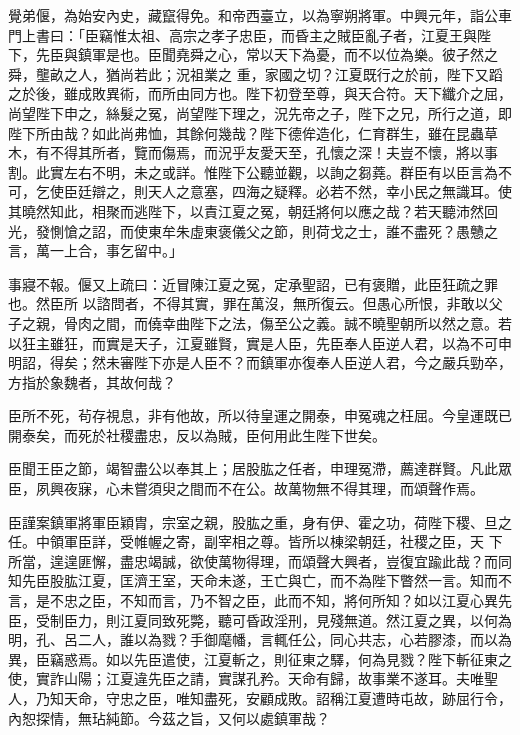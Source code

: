 \begin{pinyinscope}
 覺弟偃，為始安內史，藏竄得免。和帝西臺立，以為寧朔將軍。中興元年，詣公車門上書曰：「臣竊惟太祖、高宗之孝子忠臣，而昏主之賊臣亂子者，江夏王與陛下，先臣與鎮軍是也。臣聞堯舜之心，常以天下為憂，而不以位為樂。彼孑然之舜，壟畝之人，猶尚若此；況祖業之
 重，家國之切？江夏既行之於前，陛下又蹈之於後，雖成敗異術，而所由同方也。陛下初登至尊，與天合符。天下纖介之屈，尚望陛下申之，絲髮之冤，尚望陛下理之，況先帝之子，陛下之兄，所行之道，即陛下所由哉？如此尚弗恤，其餘何幾哉？陛下德侔造化，仁育群生，雖在昆蟲草木，有不得其所者，覽而傷焉，而況乎友愛天至，孔懷之深！夫豈不懷，將以事割。此實左右不明，未之或詳。惟陛下公聽並觀，以詢之芻蕘。群臣有以臣言為不可，乞使臣廷辯之，則天人之意塞，四海之疑釋。必若不然，幸小民之無識耳。使其曉然知此，相聚而逃陛下，以責江夏之冤，朝廷將何以應之哉？若天聽沛然回光，發惻愴之詔，而使東牟朱虛東褒儀父之節，則荷戈之士，誰不盡死？愚戇之言，萬一上合，事乞留中。」



 事寢不報。偃又上疏曰：近冒陳江夏之冤，定承聖詔，已有褒贈，此臣狂疏之罪也。然臣所
 以諮問者，不得其實，罪在萬沒，無所復云。但愚心所恨，非敢以父子之親，骨肉之間，而僥幸曲陛下之法，傷至公之義。誠不曉聖朝所以然之意。若以狂主雖狂，而實是天子，江夏雖賢，實是人臣，先臣奉人臣逆人君，以為不可申明詔，得矣；然未審陛下亦是人臣不？而鎮軍亦復奉人臣逆人君，今之嚴兵勁卒，方指於象魏者，其故何哉？



 臣所不死，茍存視息，非有他故，所以待皇運之開泰，申冤魂之枉屈。今皇運既已開泰矣，而死於社稷盡忠，反以為賊，臣何用此生陛下世矣。



 臣聞王臣之節，竭智盡公以奉其上；居股肱之任者，申理冤滯，薦達群賢。凡此眾臣，夙興夜寐，心未嘗須臾之間而不在公。故萬物無不得其理，而頌聲作焉。



 臣謹案鎮軍將軍臣穎胄，宗室之親，股肱之重，身有伊、霍之功，荷陛下稷、旦之任。中領軍臣詳，受帷幄之寄，副宰相之尊。皆所以棟梁朝廷，社稷之臣，天
 下所當，遑遑匪懈，盡忠竭誠，欲使萬物得理，而頌聲大興者，豈復宜踰此哉？而同知先臣股肱江夏，匡濟王室，天命未遂，王亡與亡，而不為陛下瞥然一言。知而不言，是不忠之臣，不知而言，乃不智之臣，此而不知，將何所知？如以江夏心異先臣，受制臣力，則江夏同致死斃，聽可昏政淫刑，見殘無道。然江夏之異，以何為明，孔、呂二人，誰以為戮？手御麾幡，言輒任公，同心共志，心若膠漆，而以為異，臣竊惑焉。如以先臣遣使，江夏斬之，則征東之驛，何為見戮？陛下斬征東之使，實詐山陽；江夏違先臣之請，實謀孔矜。天命有歸，故事業不遂耳。夫唯聖人，乃知天命，守忠之臣，唯知盡死，安顧成敗。詔稱江夏遭時屯故，跡屈行令，內恕探情，無玷純節。今茲之旨，又何以處鎮軍哉？




\end{pinyinscope}
